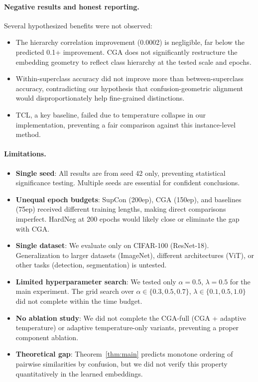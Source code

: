 \documentclass{article}
\begin{document}
\paragraph{Negative results and honest reporting.}
Several hypothesized benefits were not observed:
\begin{itemize}
    \item The hierarchy correlation improvement (0.0002) is negligible, far below the predicted 0.1+ improvement. CGA does not significantly restructure the embedding geometry to reflect class hierarchy at the tested scale and epochs.
    \item Within-superclass accuracy did not improve more than between-superclass accuracy, contradicting our hypothesis that confusion-geometric alignment would disproportionately help fine-grained distinctions.
    \item TCL, a key baseline, failed due to temperature collapse in our implementation, preventing a fair comparison against this instance-level method.
\end{itemize}

\paragraph{Limitations.}
\begin{itemize}
    \item \textbf{Single seed}: All results are from seed 42 only, preventing statistical significance testing. Multiple seeds are essential for confident conclusions.
    \item \textbf{Unequal epoch budgets}: SupCon (200ep), CGA (150ep), and baselines (75ep) received different training lengths, making direct comparisons imperfect. HardNeg at 200 epochs would likely close or eliminate the gap with CGA.
    \item \textbf{Single dataset}: We evaluate only on CIFAR-100 (ResNet-18). Generalization to larger datasets (ImageNet), different architectures (ViT), or other tasks (detection, segmentation) is untested.
    \item \textbf{Limited hyperparameter search}: We tested only $\alpha=0.5$, $\lambda=0.5$ for the main experiment. The grid search over $\alpha \in \{0.3, 0.5, 0.7\}$, $\lambda \in \{0.1, 0.5, 1.0\}$ did not complete within the time budget.
    \item \textbf{No ablation study}: We did not complete the CGA-full (CGA + adaptive temperature) or adaptive temperature-only variants, preventing a proper component ablation.
    \item \textbf{Theoretical gap}: Theorem~\ref{thm:main} predicts monotone ordering of pairwise similarities by confusion, but we did not verify this property quantitatively in the learned embeddings.
\end{itemize}
\end{document}
